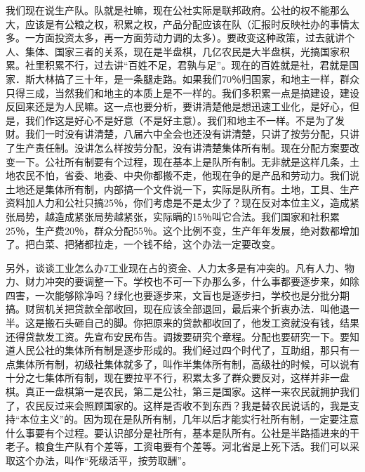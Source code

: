 我们现在说生产队。队就是社嘛，现在公社实际是联邦政府。公社的权不能那么大，应该是有公粮之权，积累之权，产品分配应该在队（汇报时反映社办的事情太多。一方面投资太多，再一方面劳动力调的太多）。要政变这种政策，过去就讲个人、集体、国家三者的关系，现在是半盘棋，几亿农民是大半盘棋，光搞国家积累。社里积累不行，过去讲“百姓不足，君孰与足”。现在的百姓就是社，君就是国家．斯大林搞了三十年，是一条腿走路。如果我们70％归国家，和地主一样，群众只得三成，当然我们和地主的本质上是不一样的。我们多积累一点是搞建设，建设反回来还是为人民嘛。这一点也要分析，要讲清楚他是想迅速工业化，是好心，但是，我们作这是好心不是好意（不是好主意）。我们和地主不一样。不是为了发财。我们一时没有讲清楚，八届六中全会也还没有讲清楚，只讲了按劳分配，只讲了生产责任制。没讲怎么样按劳分配，没有讲清楚集体所有制。现在分配方案要改变一下。公社所有制要有个过程，现在基本上是队所有制。无非就是这样几条，土地农民不怕，省委、地委、中央你都搬不走，他现在争的是产品和劳动力。我们说土地还是集体所有制，内部搞一个文件说一下，实际是队所有。土地，工具、生产资料加人力和公社只搞25％，你们考虑是不是太少了？现在反对本位主义，造成紧张局势，越造成紧张局势越紧张，实际瞒的15％叫它合法。我们国家和社积累25％，生产费20％，群众分配55％。这个比例不变，生产年年发展，绝对数都增加了。把白菜、把猪都拉走，一个钱不给，这个办法一定要改变。

另外，谈谈工业怎么办7工业现在占的资金、人力太多是有冲突的。凡有人力、物力、财力冲突的要调整一下。学校也不可一下办那么多，什么事都要逐步来，如除四害，一次能够除净吗？绿化也要逐步来，文盲也是逐步扫，学校也是分批分期搞。财贸机关把贷款全部收回，现在应该全部退回，最后来个折衷办法．叫他退一半。这是搬石头砸自己的脚。你把原来的贷款都收回了，他发工资就没有钱，结果还得贷款发工资。先宣布安民布告。调拨要研究个章程。分配也要研究一下。要知道人民公社的集体所有制是逐步形成的。我们经过四个时代了，互助组，那只有一点集体所有制，初级社集体就多了，叫作半集体所有制，高级社的时候，可以说有十分之七集体所有制，现在要拉平不行，积累太多了群众要反对，这样并非一盘棋。真正一盘棋第一是农民，第二是公社，第三是国家。这样一来农民就拥护我们了，农民反过来会照顾国家的。这样是否收不到东西？我是替农民说话的，我是支持“本位主义”的。因为现在是队所有制，几年以后才能实行社所有制，一定要注意什么事要有个过程。要认识部分是社所有，基本是队所有。公社是半路插进来的干老子。粮食生产队有个差等，工资电要有个差等。河北省是上死下活。我们可以采取这个办法，叫作“死级活平，按劳取酬”。



